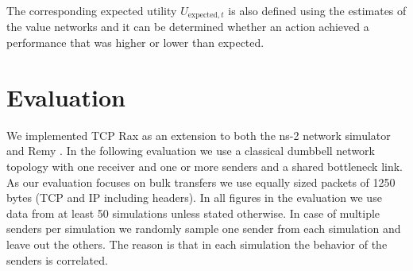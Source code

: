 \documentclass[newfonts=false,format=sigconf,10pt,letterpaper]{acmart}
\begin{document}
The corresponding expected utility $U_{\text{expected},t}$ is also defined using the estimates of the value networks and it can be determined whether an action achieved a performance that was higher or lower than expected. 

%
%

\section{Evaluation}

We implemented TCP Rax as an extension to both the ns-2 network simulator \cite{fall_network_2007} and Remy \cite{winstein_tcp_2013}.  
In the following evaluation we use a classical dumbbell network topology with one receiver and one or more senders and a shared bottleneck link. As our evaluation focuses on bulk transfers we use equally sized packets of 1250 bytes (TCP and IP including headers). In all figures in the evaluation we use data from at least 50 simulations unless stated otherwise. In case of multiple senders per simulation we randomly sample one sender from each simulation and leave out the others. The reason is that in each simulation the behavior of the senders is correlated. 
\end{document}
